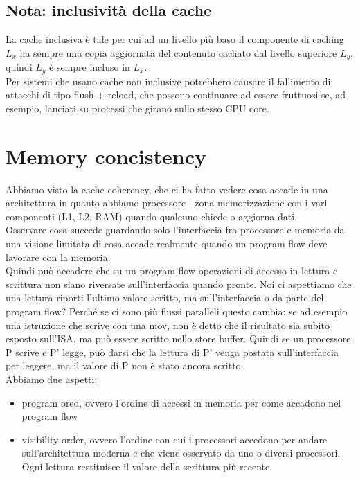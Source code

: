 \documentclass[12pt, oneside]{extbook}
\begin{document}
\subsection{Nota: inclusività della cache}
La cache inclusiva è tale per cui ad un livello più baso il componente di caching $L_x$ ha sempre una copia aggiornata del contenuto cachato dal livello superiore $L_y$, quindi $L_y$ è sempre incluso in $L_x$.\\ Per sistemi che usano cache non inclusive potrebbero causare il fallimento di attacchi di tipo flush + reload, che possono continuare ad essere fruttuosi se, ad esempio, lanciati su processi che girano sullo stesso CPU core.
\section{Memory concistency}
Abbiamo visto la cache coherency, che ci ha fatto vedere cosa accade in una architettura in quanto abbiamo processore $|$ zona memorizzazione con i vari componenti (L1, L2, RAM) quando qualcuno chiede o aggiorna dati.\\ Osservare cosa succede guardando solo l'interfaccia fra processore e memoria da una visione limitata di cosa accade realmente quando un program flow deve lavorare con la memoria. \\ Quindi può accadere che su un program flow operazioni di accesso in lettura e scrittura non siano riversate sull'interfaccia quando pronte. Noi ci aspettiamo che una lettura riporti l'ultimo valore scritto, ma sull'interfaccia o da parte del program flow? Perché se ci sono più flussi paralleli questo cambia: se ad esempio una istruzione che scrive con una mov, non è detto che il risultato sia subito esposto sull'ISA, ma può essere scritto nello store buffer. Quindi se un processore P scrive e P' legge, può darsi che la lettura di P' venga postata sull'interfaccia per leggere, ma il valore di P non è stato ancora scritto.\\ Abbiamo due aspetti:
\begin{itemize}
\item program ored, ovvero l'ordine di accessi in memoria per come accadono nel program flow
\item visibility order, ovvero l'ordine con cui i processori accedono per andare sull'architettura moderna e che viene osservato da uno o diversi processori. Ogni lettura restituisce il valore della scrittura più recente
\end{itemize}
\end{document}
